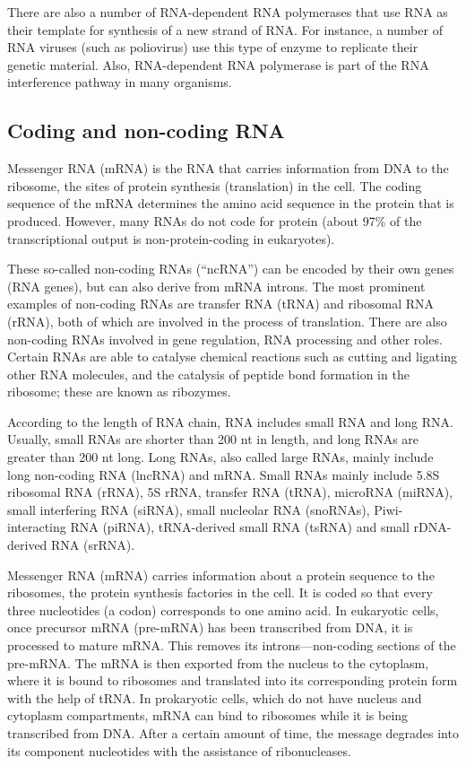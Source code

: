 There are also a number of RNA-dependent RNA polymerases that use RNA as their template for synthesis of a new strand of RNA. For instance, a number of RNA viruses (such as poliovirus) use this type of enzyme to replicate their genetic material. Also, RNA-dependent RNA polymerase is part of the RNA interference pathway in many organisms.

\hypertarget{coding-and-non-coding-rna}{%
\subsection{Coding and non-coding RNA}\label{coding-and-non-coding-rna}}

Messenger RNA (mRNA) is the RNA that carries information from DNA to the ribosome, the sites of protein synthesis (translation) in the cell. The coding sequence of the mRNA determines the amino acid sequence in the protein that is produced. However, many RNAs do not code for protein (about 97\% of the transcriptional output is non-protein-coding in eukaryotes).

These so-called non-coding RNAs (``ncRNA'') can be encoded by their own genes (RNA genes), but can also derive from mRNA introns. The most prominent examples of non-coding RNAs are transfer RNA (tRNA) and ribosomal RNA (rRNA), both of which are involved in the process of translation. There are also non-coding RNAs involved in gene regulation, RNA processing and other roles. Certain RNAs are able to catalyse chemical reactions such as cutting and ligating other RNA molecules, and the catalysis of peptide bond formation in the ribosome; these are known as ribozymes.

According to the length of RNA chain, RNA includes small RNA and long RNA. Usually, small RNAs are shorter than 200 nt in length, and long RNAs are greater than 200 nt long. Long RNAs, also called large RNAs, mainly include long non-coding RNA (lncRNA) and mRNA. Small RNAs mainly include 5.8S ribosomal RNA (rRNA), 5S rRNA, transfer RNA (tRNA), microRNA (miRNA), small interfering RNA (siRNA), small nucleolar RNA (snoRNAs), Piwi-interacting RNA (piRNA), tRNA-derived small RNA (tsRNA) and small rDNA-derived RNA (srRNA).

Messenger RNA (mRNA) carries information about a protein sequence to the ribosomes, the protein synthesis factories in the cell. It is coded so that every three nucleotides (a codon) corresponds to one amino acid. In eukaryotic cells, once precursor mRNA (pre-mRNA) has been transcribed from DNA, it is processed to mature mRNA. This removes its introns---non-coding sections of the pre-mRNA. The mRNA is then exported from the nucleus to the cytoplasm, where it is bound to ribosomes and translated into its corresponding protein form with the help of tRNA. In prokaryotic cells, which do not have nucleus and cytoplasm compartments, mRNA can bind to ribosomes while it is being transcribed from DNA. After a certain amount of time, the message degrades into its component nucleotides with the assistance of ribonucleases.

